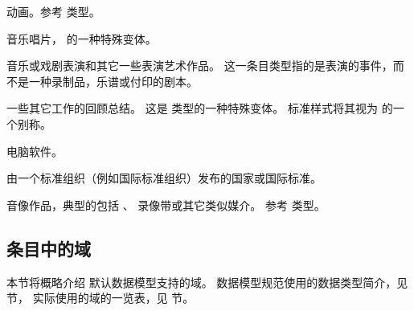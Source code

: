 \begin{typelist}
动画。参考  类型。

音乐唱片， 的一种特殊变体。

音乐或戏剧表演和其它一些表演艺术作品。
这一条目类型指的是表演的事件，而不是一种录制品，乐谱或付印的剧本。

一些其它工作的回顾总结。
这是  类型的一种特殊变体。
标准样式将其视为  的一个别称。

电脑软件。

由一个标准组织（例如国际标准组织）发布的国家或国际标准。

音像作品，典型的包括 、 录像带或其它类似媒介。
参考  类型。

\end{typelist}

\subsection{条目中的域}%
\label{bib:fld}


本节将概略介绍 \biblatex 默认数据模型支持的域。
数据模型规范使用的数据类型简介，见  节，
实际使用的域的一览表，见  节。

